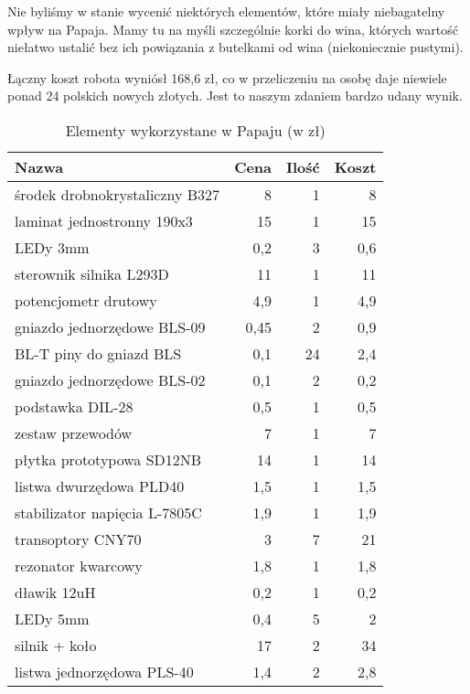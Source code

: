 \documentclass{article}
\begin{document}
Nie byliśmy w stanie wycenić niektórych elementów, które miały niebagatelny wpływ na Papaja. Mamy tu na myśli szczególnie korki do wina, których wartość niełatwo ustalić bez ich powiązania z butelkami od wina (niekoniecznie pustymi). 

Łączny koszt robota wyniósł 168,6 zł, co w przeliczeniu na osobę daje niewiele ponad 24 polskich nowych złotych. Jest to naszym zdaniem bardzo udany wynik.

\begin{table}[!htbp]
\centering
\caption{Elementy wykorzystane w Papaju (w zł)}
\label{table:koszta}
\begin{tabular}{l|r|r|r}
Nazwa                          & Cena & Ilość & Koszt \\
\hline
środek drobnokrystaliczny B327 & 8    & 1     & 8     \\
laminat jednostronny 190x3     & 15   & 1     & 15    \\
LEDy 3mm                       & 0,2  & 3     & 0,6   \\
sterownik silnika L293D        & 11   & 1     & 11    \\
potencjometr drutowy           & 4,9  & 1     & 4,9   \\
gniazdo jednorzędowe BLS-09    & 0,45 & 2     & 0,9   \\
BL-T piny do gniazd BLS        & 0,1  & 24    & 2,4   \\
gniazdo jednorzędowe BLS-02    & 0,1  & 2     & 0,2   \\
podstawka DIL-28               & 0,5  & 1     & 0,5   \\
zestaw przewodów               & 7    & 1     & 7     \\
płytka prototypowa SD12NB      & 14   & 1     & 14    \\
listwa dwurzędowa PLD40        & 1,5  & 1     & 1,5   \\
stabilizator napięcia L-7805C  & 1,9  & 1     & 1,9   \\
transoptory CNY70              & 3    & 7     & 21    \\
rezonator kwarcowy             & 1,8  & 1     & 1,8   \\
dławik 12uH                    & 0,2  & 1     & 0,2   \\
LEDy 5mm                       & 0,4  & 5     & 2     \\
silnik + koło                  & 17   & 2     & 34    \\
listwa jednorzędowa PLS-40     & 1,4  & 2     & 2,8   \\

\end{tabular}
\end{table}
\end{document}
